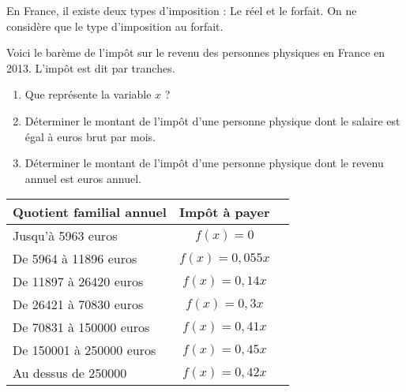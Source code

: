 
En France, il existe deux types d'imposition : Le réel et le forfait. On ne considère que le type d'imposition au forfait.

\medskip
Voici le barème de l'impôt sur le revenu des personnes physiques en France en 2013. L'impôt est dit par tranches.
\medskip

\begin{minipage}{10cm}
\begin{enumerate}
\item Que représente la variable $x$ ?
\item Déterminer le montant de l'impôt d'une personne physique dont le salaire est égal à  euros brut par mois.
\item Déterminer le montant de l'impôt d'une personne physique dont le revenu annuel est  euros annuel.
\end{enumerate}
\end{minipage}
\begin{minipage}{7cm}

\begin{flushright}
\begin{tabular}{|l|c|c|} 
\hline
Quotient familial annuel & Impôt à payer \\
\hline
Jusqu'à 5963 euros & $f(x)=0$  \\
\hline
De 5964 à 11896 euros & $f(x)=0,055x$   \\
\hline
De 11897 à 26420 euros & $f(x)=0,14x$   \\
\hline
De 26421 à 70830 euros & $f(x)=0,3x$    \\
\hline
De 70831 à 150000 euros & $f(x)=0,41x$ \\
\hline
De 150001 à 250000 euros & $f(x)=0,45x$  \\
\hline
Au dessus de 250000 & $f(x)=0,42x$   \\
\hline
\end{tabular}
\end{flushright}

\end{minipage}

